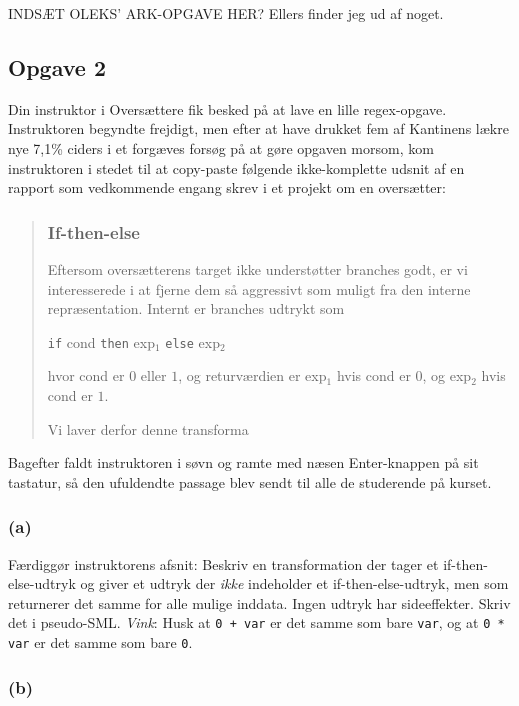 INDSÆT OLEKS' ARK-OPGAVE HER?  Ellers finder jeg ud af noget.


\newpage
\subsection{Opgave 2}

Din instruktor i Oversættere fik besked på at lave en lille regex-opgave.
Instruktoren begyndte frejdigt, men efter at have drukket fem af Kantinens lækre
nye 7,1\% ciders i et forgæves forsøg på at gøre opgaven morsom, kom
instruktoren i stedet til at copy-paste følgende ikke-komplette udsnit af en
rapport som vedkommende engang skrev i et projekt om en oversætter:

\begin{quote}
\subsubsection{If-then-else}

Eftersom oversætterens target ikke understøtter branches godt, er vi
interesserede i at fjerne dem så aggressivt som muligt fra den interne
repræsentation.  Internt er branches udtrykt som

\texttt{if} cond \texttt{then} exp$_1$ \texttt{else} exp$_2$

hvor cond er $0$ eller $1$, og returværdien er exp$_1$ hvis cond er $0$, og
exp$_2$ hvis cond er $1$.

Vi laver derfor denne transforma
\end{quote}

Bagefter faldt instruktoren i søvn og ramte med næsen Enter-knappen på sit
tastatur, så den ufuldendte passage blev sendt til alle de studerende på kurset.


\subsubsection{(a)}

Færdiggør instruktorens afsnit: Beskriv en transformation der tager et
if-then-else-udtryk og giver et udtryk der \emph{ikke} indeholder et
if-then-else-udtryk, men som returnerer det samme for alle mulige inddata.
Ingen udtryk har sideeffekter.  Skriv det i pseudo-SML.  \emph{Vink}: Husk at
\texttt{0 + var} er det samme som bare \texttt{var}, og at \texttt{0 * var} er
det samme som bare \texttt{0}.


\subsubsection{(b)}

